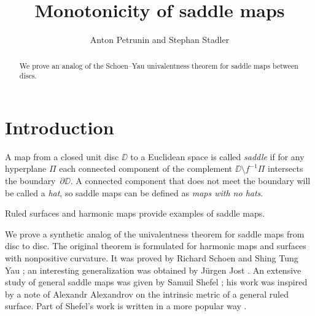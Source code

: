 \documentclass{article}
\def\thetitle{Monotonicity of saddle maps}
\def\theauthors{Anton Petrunin and Stephan Stadler}
\begin{document}


\title{\thetitle}
\author{\theauthors}


\newcommand{\Addresses}{{\bigskip\footnotesize
Anton Petrunin, \par\nopagebreak\textsc{Department of Mathematics, PSU, University Park, PA 16802, USA}
\par\nopagebreak
\textit{Email}: \texttt{petrunin@math.psu.edu}

\medskip

Stephan Stadler,
\par\nopagebreak\textsc{Mathematisches Institut der Universit\"at M\"unchen, Theresienstr. 39, D-80333 M\"unchen, Germany}
\par\nopagebreak
\textit{Email}: \texttt{stadler@math.lmu.de}
}}

\date{}

\maketitle

\begin{abstract}
We prove an analog of the Schoen--Yau univalentness theorem for saddle maps between discs.
\end{abstract}

\section{Introduction}

A map from a closed unit disc $\DD$ to a Euclidean space is called \emph{saddle} if for any hyperplane $\Pi$ each connected component of the 
complement $\DD\setminus f^{-1}\Pi$ intersects the boundary~$\partial \DD$.
A connected component that does not meet the boundary will be called a \emph{hat},
so saddle maps can be defined as \emph{maps with no hats}.

Ruled surfaces and harmonic maps provide examples of saddle maps.

We prove a synthetic analog of the univalentness theorem for saddle maps from disc to disc.
The original theorem is formulated for harmonic maps and surfaces with nonpositive curvature.
It was proved by Richard Schoen and Shing Tung Yau \cite{schoen-yau};
an interesting generalization was obtained by J\"urgen Jost \cite{jost}.
An extensive study of general saddle maps was given by Samuil Shefel \cite{shefel-2D,shefel-3D};
his work was inspired by a note of Alexandr Alexandrov \cite{A} on the intrinsic metric of a general ruled surface.
Part of Shefel's work is written in a more popular way \cite{akp}.
\end{document}
